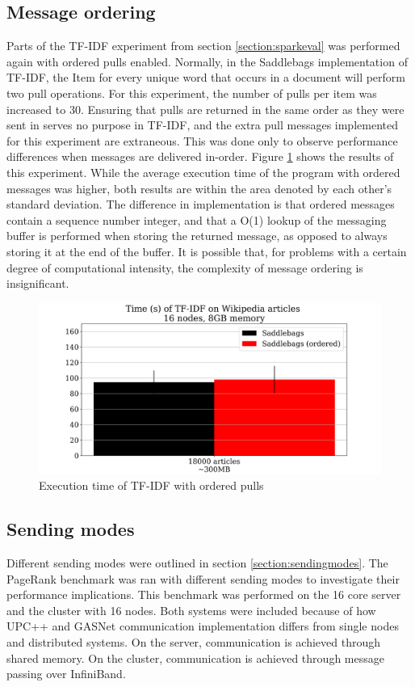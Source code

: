 \documentclass{uit-report}
\begin{document}
\subsection{Message ordering}
Parts of the TF-IDF experiment from section \ref{section:sparkeval} was performed again with ordered pulls enabled. Normally, in the Saddlebags implementation of TF-IDF, the Item for every unique word that occurs in a document will perform two pull operations. For this experiment, the number of pulls per item was increased to 30. Ensuring that pulls are returned in the same order as they were sent in serves no purpose in TF-IDF, and the extra pull messages implemented for this experiment are extraneous. This was done only to observe performance differences when messages are delivered in-order. Figure \ref{fig:ordering} shows the results of this experiment. While the average execution time of the program with ordered messages was higher, both results are within the area denoted by each other's standard deviation. The difference in implementation is that ordered messages contain a sequence number integer, and that a O(1) lookup of the messaging buffer is performed when storing the returned message, as opposed to always storing it at the end of the buffer. It is possible that, for problems with a certain degree of computational intensity, the complexity of message ordering is insignificant.
\vskip 0.5cm
\begin{figure}[H]
	\centering
	\includegraphics[width=13cm]{illustrations/png/messageordering.png}
	\caption{Execution time of TF-IDF with ordered pulls}
	\label{fig:ordering}
\end{figure}
\newpage
\subsection{Sending modes} \label{section:sendingmodeseval}
Different sending modes were outlined in section \ref{section:sendingmodes}. The PageRank benchmark was ran with different sending modes to investigate their performance implications. This benchmark was performed on the 16 core server and the cluster with 16 nodes. Both systems were included because of how UPC++ and GASNet communication implementation differs from single nodes and distributed systems. On the server, communication is achieved through shared memory. On the cluster, communication is achieved through message passing over InfiniBand.
\end{document}
